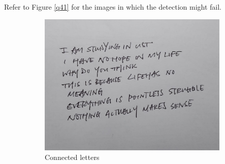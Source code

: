 \documentclass{article} %
\begin{document}
    Refer to Figure \ref{q41} for the images in which the detection might fail.

    \begin{figure}[H]
        \centering
        \begin{subfigure}[b]{0.49\textwidth}
            \centering
            \includegraphics[height=0.3\textheight,width=\textwidth,keepaspectratio=true]{4,1 img2.jpeg}
            \caption{Connected letters}
        \end{subfigure}
        \begin{subfigure}[b]{0.49\textwidth}
            \centering

\end{subfigure}
\end{figure}
\end{document}
